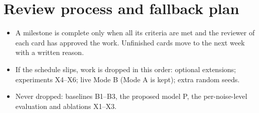 \documentclass[11pt,a4paper]{article}
\begin{document}
\section{Review process and fallback plan}
\begin{itemize}
  \item A milestone is complete only when all its criteria are met and the
        reviewer of each card has approved the work. Unfinished cards move to
        the next week with a written reason.
  \item If the schedule slips, work is dropped in this order: optional
        extensions; experiments X4--X6; live Mode B (Mode A is kept); extra
        random seeds.
  \item Never dropped: baselines B1--B3, the proposed model P, the per-noise-level
        evaluation and ablations X1--X3.
\end{itemize}
\end{document}
